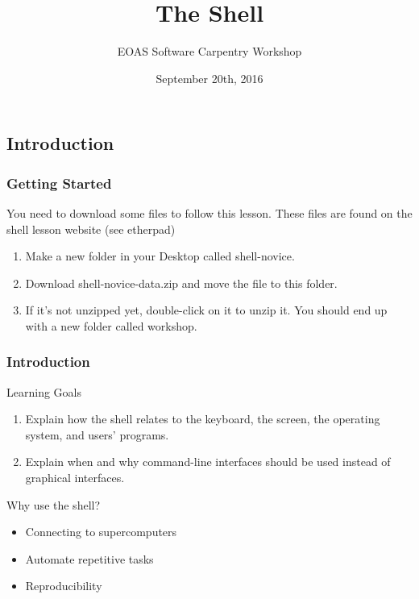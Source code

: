 \documentclass{beamer}
\title[Shell Lesson]{The Shell}
\subtitle[]{EOAS Software Carpentry Workshop }
\date[Sep 2016]{September 20th, 2016}
\begin{document}





 
\begin{frame}[plain]
  
\titlepage


\end{frame}




\subsection*{Introduction}

\begin{frame}
\frametitle{Getting Started}

You need to download some files to follow this lesson. These files are found on the shell lesson website (see etherpad)

\begin{enumerate}
\item Make a new folder in your Desktop called shell-novice.
\item Download shell-novice-data.zip and move the file to this folder.
\item If it's not unzipped yet, double-click on it to unzip it. You should end up with a new folder called workshop.
\end{enumerate}
\end{frame}


\begin{frame}
\frametitle{Introduction}
\begin{block}{Learning Goals}
\begin{enumerate}

 \item   Explain how the shell relates to the keyboard, the screen, the operating system, and users' programs.
 \item   Explain when and why command-line interfaces should be used instead of graphical interfaces.

\end{enumerate}
\end{block}
\pause
\begin{block}{Why use the shell?}
\begin{itemize}
\pause
\item Connecting to supercomputers
\pause
\item Automate repetitive tasks
\pause
\item Reproducibility 
\end{itemize}
\end{block}
\end{frame}
\end{document}
